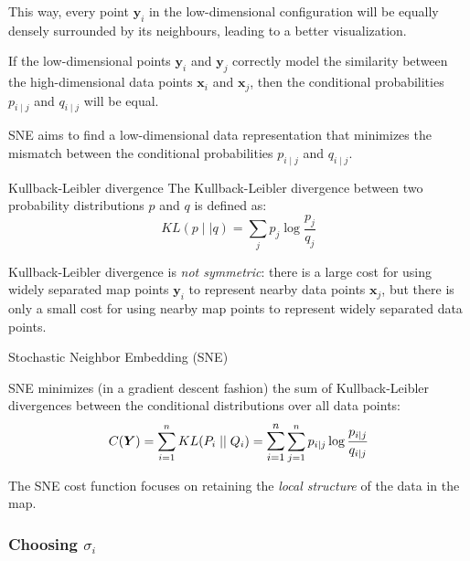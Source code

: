 This way, every point $\boldsymbol y_i$ in the low-dimensional configuration will be
equally densely surrounded by its neighbours, leading to a better visualization.

If the low-dimensional points $\boldsymbol y_i$ and $\boldsymbol y_j$ correctly model
the similarity between the high-dimensional data points $\boldsymbol x_i$ and $\boldsymbol x_j$,
then the conditional probabilities $p_{i \mid j}$ and $q_{i \mid j}$ will be equal.

\begin{marker}
	SNE aims to find a low-dimensional data representation that minimizes
	the mismatch between the conditional probabilities $p_{i \mid j}$ and $q_{i \mid j}$.
\end{marker}

\begin{definition}{Kullback-Leibler divergence}
	The Kullback-Leibler divergence between two probability distributions $p$ and $q$ is defined as:
	\begin{equation*}
		KL(p \mid\mid q) = \sum_{j} p_j \log \frac{p_j}{q_j}
	\end{equation*}
	\tcblower
	\begin{note}
        Kullback-Leibler divergence is \emph{not symmetric}: there is a large
		cost for using widely separated map points $\boldsymbol y_i$ to
		represent nearby data points $\boldsymbol x_j$, but there is only a small
		cost for using nearby map points to represent widely separated data points.
	\end{note}
\end{definition}

\begin{problem}{Stochastic Neighbor Embedding (SNE)}{}

SNE minimizes (in a gradient descent fashion) the sum of Kullback-Leibler
divergences between the conditional distributions over all data points:
\begin{equation*}
	C(\boldsymbol Y) = \sum_{i=1}^n KL(P_i \mid\mid Q_i) =
	\mathlarger{\sum_{i=1}^n} \sum_{j=1}^n p_{i \mid j} \log \frac{p_{i \mid j}}{q_{i \mid j}}
\end{equation*}
\tcblower
\begin{note}
    The SNE cost function focuses on retaining the \emph{local structure} of the data in
	the map.
\end{note}
\end{problem}

\subsubsection{Choosing $\sigma_i$}

